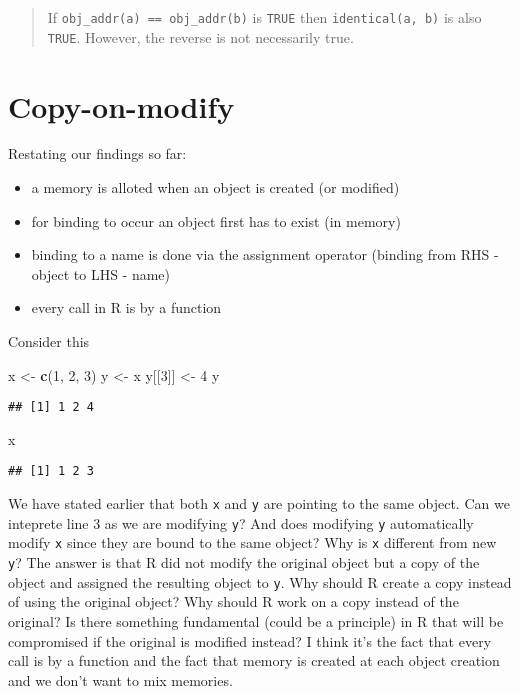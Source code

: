 \documentclass[]{book}
\newenvironment{Shaded}{\begin{snugshade}}{\end{snugshade}}
\newcommand{\DecValTok}[1]{\textcolor[rgb]{0.00,0.00,0.81}{#1}}
\newcommand{\KeywordTok}[1]{\textcolor[rgb]{0.13,0.29,0.53}{\textbf{#1}}}
\newcommand{\NormalTok}[1]{#1}
\newcommand{\StringTok}[1]{\textcolor[rgb]{0.31,0.60,0.02}{#1}}
\providecommand{\tightlist}{%
  \setlength{\itemsep}{0pt}\setlength{\parskip}{0pt}}
\begin{document}
\begin{quote}
If \texttt{obj\_addr(a)\ ==\ obj\_addr(b)} is \texttt{TRUE} then \texttt{identical(a,\ b)} is also \texttt{TRUE}. However, the reverse is not necessarily true.
\end{quote}

\hypertarget{copy-on-modify}{%
\section{Copy-on-modify}\label{copy-on-modify}}

Restating our findings so far:

\begin{itemize}
\tightlist
\item
  a memory is alloted when an object is created (or modified)
\item
  for binding to occur an object first has to exist (in memory)
\item
  binding to a name is done via the assignment operator (binding from RHS - object to LHS - name)
\item
  every call in R is by a function
\end{itemize}

Consider this

\begin{Shaded}
\begin{Highlighting}[]
\NormalTok{x <-}\StringTok{ }\KeywordTok{c}\NormalTok{(}\DecValTok{1}\NormalTok{, }\DecValTok{2}\NormalTok{, }\DecValTok{3}\NormalTok{)}
\NormalTok{y <-}\StringTok{ }\NormalTok{x}
\NormalTok{y[[}\DecValTok{3}\NormalTok{]] <-}\StringTok{ }\DecValTok{4}
\NormalTok{y}
\end{Highlighting}
\end{Shaded}

\begin{verbatim}
## [1] 1 2 4
\end{verbatim}

\begin{Shaded}
\begin{Highlighting}[]
\NormalTok{x}
\end{Highlighting}
\end{Shaded}

\begin{verbatim}
## [1] 1 2 3
\end{verbatim}

We have stated earlier that both \texttt{x} and \texttt{y} are pointing to the same object. Can we inteprete line 3 as we are modifying \texttt{y}? And does modifying \texttt{y} automatically modify \texttt{x} since they are bound to the same object? Why is \texttt{x} different from new \texttt{y}? The answer is that R did not modify the original object but a copy of the object and assigned the resulting object to \texttt{y}. Why should R create a copy instead of using the original object? Why should R work on a copy instead of the original? Is there something fundamental (could be a principle) in R that will be compromised if the original is modified instead? I think it's the fact that every call is by a function and the fact that memory is created at each object creation and we don't want to mix memories.
\end{document}
